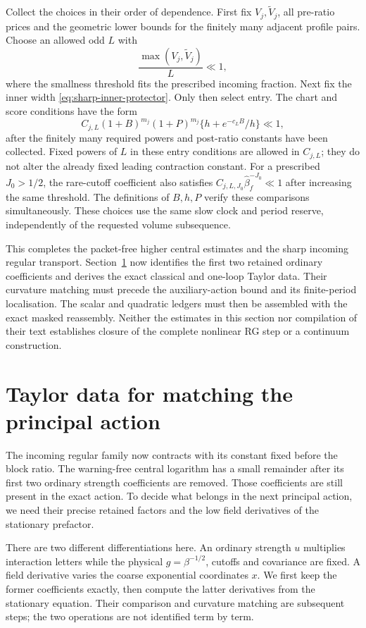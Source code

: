 \documentclass[11pt,reqno]{amsart}
\numberwithin{equation}{section}
\theoremstyle{definition}
\theoremstyle{remark}
\begin{document}
Collect the choices in their order of dependence.
First fix \(V_j,\widetilde V_j\), all pre-ratio prices
and the geometric lower bounds for the finitely many
adjacent profile pairs. Choose an allowed odd \(L\) with
\[
                         \frac{\max(V_j,\widetilde V_j)}L\ll1,
\]
where the smallness threshold fits the prescribed incoming
fraction. Next fix the inner width
\eqref{eq:sharp-inner-protector}. Only then select entry.
The chart and score conditions have the form
\[
 C_{j,L}(1+B)^{m_j}(1+P)^{m_j}
                  \{h+e^{-c_LB}/h\}\ll1,
\]
after the finitely many required powers and post-ratio
constants have been collected. Fixed powers of \(L\)
in these entry conditions are allowed in \(C_{j,L}\);
they do not alter the already fixed leading contraction
constant. For a prescribed \(J_0>1/2\), the rare-cutoff
coefficient also satisfies
\(C_{j,L,J_0}\widehat\beta_f^{-J_0}\ll1\) after increasing
the same threshold. The definitions of \(B,h,P\) verify
these comparisons simultaneously. These choices use the
same slow clock and period reserve, independently of
the requested volume subsequence.

This completes the packet-free higher central estimates
and the sharp incoming regular transport. Section~\ref{sec:matching-taylor-data} now identifies the first
two retained ordinary coefficients and derives the exact classical
and one-loop Taylor data. Their curvature matching must precede
the auxiliary-action bound and its finite-period localisation. The scalar and quadratic
ledgers must then be assembled with the exact masked
reassembly. Neither the estimates in this section nor
compilation of their text establishes closure of the
complete nonlinear RG step or a continuum construction.

\section{Taylor data for matching the principal action}
\label{sec:matching-taylor-data}

The incoming regular family now contracts with its constant
fixed before the block ratio. The warning-free central
logarithm has a small remainder after its first two ordinary
strength coefficients are removed. Those coefficients are
still present in the exact action. To decide what belongs
in the next principal action, we need their precise retained
factors and the low field derivatives of the stationary
prefactor.

There are two different differentiations here. An ordinary
strength \(u\) multiplies interaction letters while the
physical \(g=\beta^{-1/2}\), cutoffs and covariance are fixed.
A field derivative varies the coarse exponential coordinates
\(x\). We first keep the former coefficients exactly, then
compute the latter derivatives from the stationary equation.
Their comparison and curvature matching are subsequent steps;
the two operations are not identified term by term.
\end{document}
